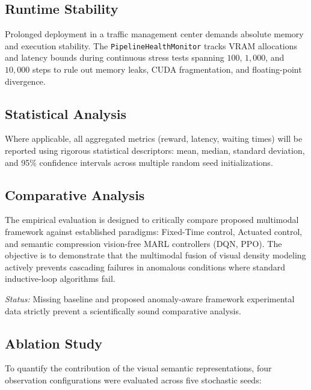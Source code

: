 \documentclass[conference]{IEEEtran}
\begin{document}
\subsection{Runtime Stability}
\label{subsec:runtime_stability}

Prolonged deployment in a traffic management center demands absolute memory and execution stability. The \texttt{PipelineHealthMonitor} tracks VRAM allocations and latency bounds during continuous stress tests spanning $100$, $1,000$, and $10,000$ steps to rule out memory leaks, CUDA fragmentation, and floating-point divergence.



\subsection{Statistical Analysis}
\label{subsec:statistical_analysis}

Where applicable, all aggregated metrics (reward, latency, waiting times) will be reported using rigorous statistical descriptors: mean, median, standard deviation, and 95\% confidence intervals across multiple random seed initializations. 



\subsection{Comparative Analysis}
\label{subsec:comparative_analysis}

The empirical evaluation is designed to critically compare proposed multimodal framework against established paradigms: Fixed-Time control, Actuated control, and semantic compression vision-free MARL controllers (DQN, PPO). The objective is to demonstrate that the multimodal fusion of visual density modeling actively prevents cascading failures in anomalous conditions where standard inductive-loop algorithms fail.

\textit{Status:} Missing baseline and proposed anomaly-aware framework experimental data strictly prevent a scientifically sound comparative analysis.

\subsection{Ablation Study}
\label{subsec:ablation_study}

To quantify the contribution of the visual semantic representations, four observation configurations were evaluated across five stochastic seeds:
\end{document}
